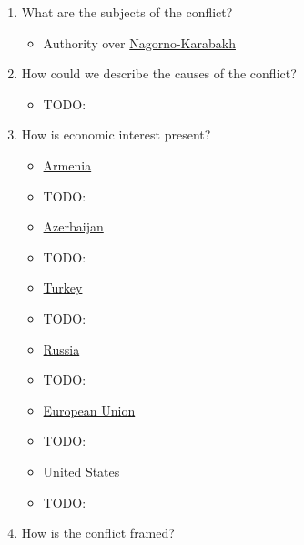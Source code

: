 \documentclass{article}
\begin{document}
\begin{enumerate}
\item
  What are the subjects of the conflict?

  \begin{itemize}
  \itemsep1pt\parskip0pt
  \item
    Authority over
    \href{https://en.wikipedia.org/wiki/Nagorno-Karabakh}{Nagorno-Karabakh}\\
  \end{itemize}
\item
  How could we describe the causes of the conflict?

  \begin{itemize}
  \itemsep1pt\parskip0pt
  \item
    TODO:\\
  \end{itemize}
\item
  How is economic interest present?

  \begin{itemize}
  \itemsep1pt\parskip0pt
  \item
    \href{https://en.wikipedia.org/wiki/Armenia}{Armenia}\\
  \item
    TODO:\\
  \item
    \href{https://en.wikipedia.org/wiki/Azerbaijan}{Azerbaijan}\\
  \item
    TODO:\\
  \item
    \href{https://en.wikipedia.org/wiki/Turkey}{Turkey}\\
  \item
    TODO:\\
  \item
    \href{https://en.wikipedia.org/wiki/Russia}{Russia}\\
  \item
    TODO:\\
  \item
    \href{https://en.wikipedia.org/wiki/European_Union}{European
    Union}\\
  \item
    TODO:\\
  \item
    \href{https://en.wikipedia.org/wiki/United_States}{United States}\\
  \item
    TODO:\\
  \end{itemize}
\item
  How is the conflict framed?


\end{enumerate}
\end{document}
